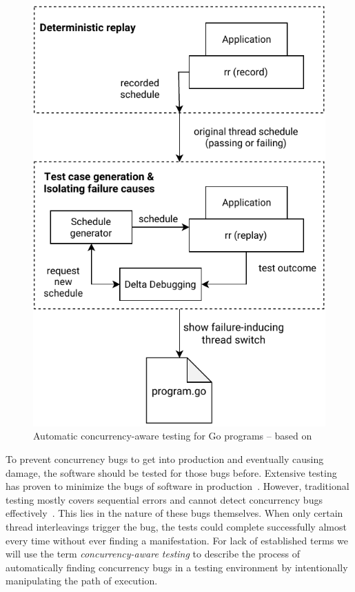 \documentclass[conference]{IEEEtran}
\begin{document}
\begin{figure}
    \includegraphics[width=\linewidth]{figures/Concurrency-Testing.pdf}
    \caption{Automatic concurrency-aware testing for Go programs -- based on\cite{acm2002}}
    \label{fig:testing}
\end{figure}

To prevent concurrency bugs to get into production and eventually causing damage, the software should be tested for those bugs before.
Extensive testing has proven to minimize the bugs of software in production~\cite{makinen2014testing}.
However, traditional testing mostly covers sequential errors and cannot detect concurrency bugs effectively~\cite{lu2008mistakes}.
This lies in the nature of these bugs themselves.
When only certain thread interleavings trigger the bug, the tests could complete successfully almost every time without ever finding a manifestation.
For lack of established terms we will use the term \emph{concurrency-aware testing} to describe the process of automatically finding concurrency bugs in a testing environment by intentionally manipulating the path of execution.
\end{document}
